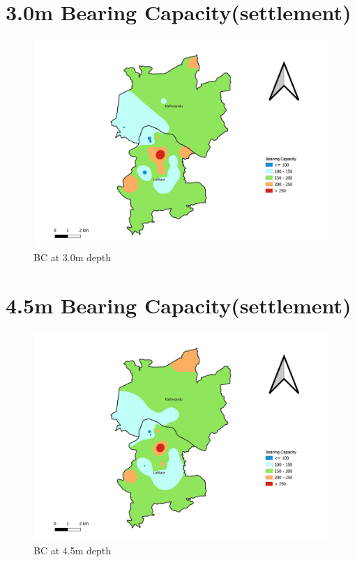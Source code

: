 \section{3.0m Bearing Capacity(settlement)}
\begin{figure}[!hbt]
\centering
\includegraphics[width=\linewidth, height=\textheight,keepaspectratio]{in/map/Deflection_3_0.png}
\caption{BC at 3.0m depth}
\end{figure}
\pagebreak

\section{4.5m Bearing Capacity(settlement)}
\begin{figure}[!hbt]
\centering
\includegraphics[width=\linewidth, height=\textheight,keepaspectratio]{in/map/Deflection_4_5.png}
\caption{BC at 4.5m depth}
\end{figure}
\pagebreak

